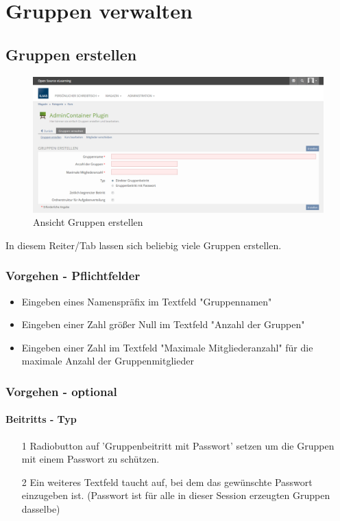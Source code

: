 \chapter{Gruppen verwalten}\label{gruppenVerwalten}
\minitoc
\clearpage

\section{Gruppen erstellen}
\begin{figure}
	\centering
	\includegraphics[width=1\textwidth]{img/gruppenErstellen.png}
	\caption{Ansicht Gruppen erstellen}
\end{figure}

In diesem Reiter/Tab lassen sich beliebig viele Gruppen erstellen. 
\subsection*{Vorgehen - Pflichtfelder}
\begin{itemize}
	\item Eingeben eines Namenspräfix im Textfeld "Gruppennamen"  
	\item Eingeben einer Zahl größer Null im Textfeld "Anzahl der Gruppen"
	\item Eingeben einer Zahl im Textfeld "Maximale Mitgliederanzahl" für die maximale Anzahl der Gruppenmitglieder 
\end{itemize}

\subsection*{Vorgehen - optional}

\subsubsection*{Beitritts - Typ}
\begin{itemize}
	\item[1] Radiobutton auf  'Gruppenbeitritt mit Passwort'   setzen um die Gruppen mit einem Passwort zu schützen. 
	\item[2] Ein weiteres Textfeld taucht auf, bei dem das gewünschte Passwort einzugeben ist. (Passwort ist für alle in dieser Session erzeugten Gruppen dasselbe)
\end{itemize}


